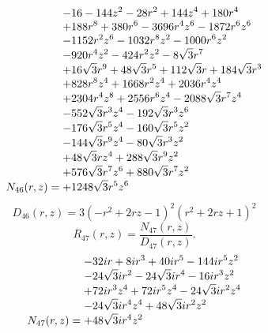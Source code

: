 \documentclass[11pt,a4paper]{article}
\begin{document}
\begin{equation}
N_{46}(r,z)=\shortstack[l]{$\displaystyle  - 16 - 144 z^{2} - 28 r^{2} + 144 z^{4} + 180 r^{4}$\\
$\displaystyle  + 188 r^{8} + 380 r^{6} - 3696 r^{4} z^{6} - 1872 r^{6} z^{6}$\\
$\displaystyle  - 1152 r^{2} z^{6} - 1032 r^{8} z^{2} - 1000 r^{6} z^{2}$\\
$\displaystyle  - 920 r^{4} z^{2} - 424 r^{2} z^{2} - 8 \sqrt{3} r^{7}$\\
$\displaystyle  + 16 \sqrt{3} r^{9} + 48 \sqrt{3} r^{5} + 112 \sqrt{3} r + 184 \sqrt{3} r^{3}$\\
$\displaystyle  + 828 r^{8} z^{4} + 1668 r^{2} z^{4} + 2036 r^{4} z^{4}$\\
$\displaystyle  + 2304 r^{4} z^{8} + 2556 r^{6} z^{4} - 2088 \sqrt{3} r^{7} z^{4}$\\
$\displaystyle  - 552 \sqrt{3} r^{3} z^{4} - 192 \sqrt{3} r^{3} z^{6}$\\
$\displaystyle  - 176 \sqrt{3} r^{5} z^{4} - 160 \sqrt{3} r^{5} z^{2}$\\
$\displaystyle  - 144 \sqrt{3} r^{9} z^{4} - 80 \sqrt{3} r^{3} z^{2}$\\
$\displaystyle  + 48 \sqrt{3} r z^{4} + 288 \sqrt{3} r^{9} z^{2}$\\
$\displaystyle  + 576 \sqrt{3} r^{7} z^{6} + 880 \sqrt{3} r^{7} z^{2}$\\
$\displaystyle  + 1248 \sqrt{3} r^{5} z^{6}$}
\label{eq:cat-numerator-46}
\end{equation}
\begin{equation}
D_{46}(r,z)=3 \left(- r^{2} + 2 r z - 1\right)^{2} \left(r^{2} + 2 r z + 1\right)^{2}
\label{eq:cat-denominator-46}
\end{equation}
\begin{equation}
R_{47}(r,z)=\frac{N_{47}(r,z)}{D_{47}(r,z)}.
\label{eq:cat-rational-47}
\end{equation}
\begin{equation}
N_{47}(r,z)=\shortstack[l]{$\displaystyle  - 32 i r + 8 i r^{3} + 40 i r^{5} - 144 i r^{5} z^{2}$\\
$\displaystyle  - 24 \sqrt{3} i r^{2} - 24 \sqrt{3} i r^{4} - 16 i r^{3} z^{2}$\\
$\displaystyle  + 72 i r^{3} z^{4} + 72 i r^{5} z^{4} - 24 \sqrt{3} i r^{2} z^{4}$\\
$\displaystyle  - 24 \sqrt{3} i r^{4} z^{4} + 48 \sqrt{3} i r^{2} z^{2}$\\
$\displaystyle  + 48 \sqrt{3} i r^{4} z^{2}$}
\label{eq:cat-numerator-47}
\end{equation}
\end{document}
